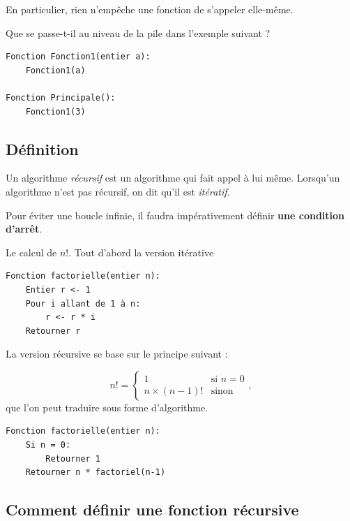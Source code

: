 \documentclass{../cours}
\begin{document}
En particulier, rien n'empêche une fonction de s'appeler elle-même.

\begin{Example}
Que se passe-t-il au niveau de la pile dans l'exemple suivant ?

\begin{lstlisting}
Fonction Fonction1(entier a):
    Fonction1(a)
    
Fonction Principale():
    Fonction1(3)
\end{lstlisting}
\end{Example}

\subsection{Définition}

\begin{Definition}
Un algorithme \emph{récursif} est un algorithme qui fait appel à lui même. Lorsqu'un algorithme n'est pas récursif, on dit qu'il est \emph{itératif}.
\end{Definition}

Pour éviter une boucle infinie, il faudra impérativement définir \textbf{une condition d'arrêt}.

\begin{Example}
Le calcul de $n!$. Tout d'abord la version itérative

\begin{lstlisting}
Fonction factorielle(entier n):
    Entier r <- 1
    Pour i allant de 1 à n:
        r <- r * i
    Retourner r
\end{lstlisting}

La version récursive se base sur le principe suivant :

\begin{equation}
n! = \begin{cases}
1 & \text{si } n = 0 \\
n \times (n-1)! & \text{sinon}
\end{cases},
\end{equation}
que l'on peut traduire sous forme d'algorithme.

\begin{lstlisting}
Fonction factorielle(entier n):
    Si n = 0:
        Retourner 1
    Retourner n * factoriel(n-1)
\end{lstlisting}
\end{Example}

\subsection{Comment définir une fonction récursive}
\end{document}
